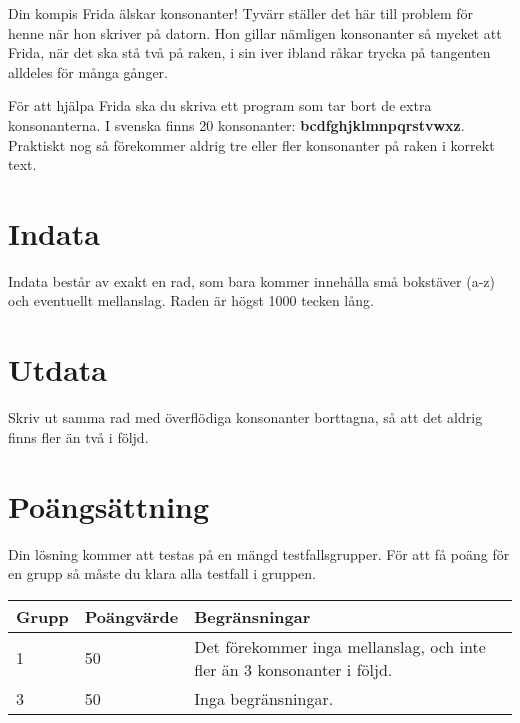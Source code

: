 Din kompis Frida älskar konsonanter! Tyvärr ställer det här till problem för henne när hon skriver på datorn. Hon gillar nämligen konsonanter så mycket att Frida, när det ska stå två på raken, i sin iver ibland råkar trycka på tangenten alldeles för många gånger.

För att hjälpa Frida ska du skriva ett program som tar bort de extra konsonanterna. I svenska finns 20 konsonanter: \textbf{bcdfghjklmnpqrstvwxz}. Praktiskt nog så förekommer aldrig tre eller fler konsonanter på raken i korrekt text.

\section*{Indata}
Indata består av exakt en rad, som bara kommer innehålla små bokstäver (a-z) och eventuellt mellanslag. Raden är högst 1000 tecken lång.

\section*{Utdata}
Skriv ut samma rad med överflödiga konsonanter borttagna, så att det aldrig finns fler än två i följd.

\section*{Poängsättning}
Din lösning kommer att testas på en mängd testfallsgrupper.
För att få poäng för en grupp så måste du klara alla testfall i gruppen.

\noindent
\begin{tabular}{| l | l | l |}
\hline
Grupp & Poängvärde & Begränsningar \\ \hline
1     & 50          &  Det förekommer inga mellanslag, och inte fler än 3 konsonanter i följd.\\ \hline
3     & 50         &  Inga begränsningar. \\ \hline
\end{tabular}

